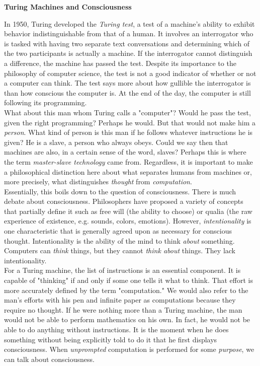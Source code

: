 \begin{tcolorbox}[breakable, enhanced, colback=textbook-blue, sharp corners]
	\vspace{3mm}
	\begin{center}
		\textbf{Turing Machines and Consciousness}
	\end{center}
	In 1950, Turing developed the \textit{Turing test}, a test of a machine's ability to exhibit behavior indistinguishable from that of a human. It involves an interrogator who is tasked with having two separate text conversations and determining which of the two participants is actually a machine. If the interrogator cannot distinguish a difference, the machine has passed the test. Despite its importance to the philosophy of computer science, the test is not a good indicator of whether or not a computer can think. The test says more about how gullible the interrogator is than how conscious the computer is. At the end of the day, the computer is still following its programming. \\
	
	What about this man whom Turing calls a "computer"? Would he pass the test, given the right programming? Perhaps he would. But that would not make him a \textit{person}. What kind of person is this man if he follows whatever instructions he is given? He is a slave, a person who always obeys. Could we say then that machines are also, in a certain sense of the word, slaves? Perhaps this is where the term \textit{master-slave technology} came from. Regardless, it is important to make a philosophical distinction here about what separates humans from machines or, more precisely, what distinguishes \textit{thought} from \textit{computation}. \\
	
	Essentially, this boils down to the question of consciousness. There is much debate about consciousness. Philosophers have proposed a variety of concepts that partially define it such as free will (the ability to choose) or qualia (the raw experience of existence, e.g. sounds, colors, emotions). However, \textit{intentionality} is one characteristic that is generally agreed upon as necessary for conscious thought. Intentionality is the ability of the mind to think \textit{about} something. Computers can \textit{think} things, but they cannot \textit{think about} things. They lack intentionality.\\
	
	For a Turing machine, the list of instructions is an essential component. It is capable of "thinking" if and only if some one tells it what to think. That effort is more accurately defined by the term "computation." We would also refer to the man's efforts with his pen and infinite paper as computations because they require no thought. If he were nothing more than a Turing machine, the man would not be able to perform mathematics on his own. In fact, he would not be able to do anything without instructions. It is the moment when he does something without being explicitly told to do it that he first displays consciousness. When \textit{unprompted} computation is performed for some \textit{purpose}, we can talk about consciousness. \\
	

\end{tcolorbox}
